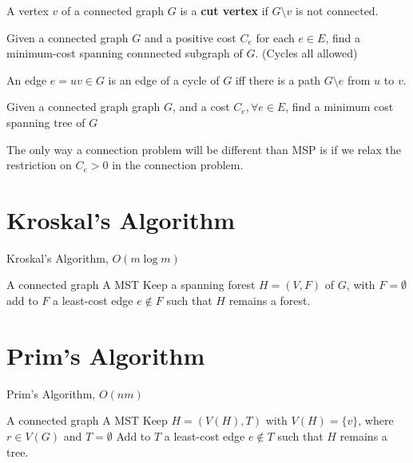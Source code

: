 			\begin{definition}
				A vertex $v$ of a connected graph $G$ is a \textbf{cut vertex} if $G\setminus v$ is not connected.
			\end{definition}

			\begin{definition}
				Given a connected graph $G$ and a positive cost $C_e$ for each $e\in E$, find a minimum-cost spanning connnected subgraph of $G$. (Cycles all allowed)
			\end{definition}

			\begin{lemma}
				An edge $e = uv \in G$ is an edge of a cycle of $G$ iff there is a path $G\setminus e$ from $u$ to $v$.
			\end{lemma}

			\begin{definition}
				Given a connected graph graph $G$, and a cost $C_e, \forall e\in E$, find a minimum cost spanning tree of $G$
			\end{definition}

			The only way a connection problem will be different than MSP is if we relax the restriction on $C_e > 0$ in the connection problem.

		\section{Kroskal's Algorithm}
			\begin{algorithm}
				\caption{Kroskal's Algorithm, $O(m \log m)$}
				\begin{algorithmic}
					\REQUIRE A connected graph
					\ENSURE A MST
					\STATE Keep a spanning forest $H=(V, F)$ of $G$, with $F=\emptyset$
						\STATE add to $F$ a least-cost edge $e\notin F$ such that $H$ remains a forest.
					\ENDWHILE
				\end{algorithmic}
			\end{algorithm}

		\section{Prim's Algorithm}
			\begin{algorithm}
				\caption{Prim's Algorithm, $O(nm)$}
				\begin{algorithmic}
					\REQUIRE A connected graph
					\ENSURE A MST
					\STATE Keep $H = (V(H), T)$ with $V(H) = \{v\}$, where $r\in V(G)$ and $T=\emptyset$
					\WHILE {$|V(T)| < |V|$}
						\STATE Add to $T$ a least-cost edge $e \notin T$ such that $H$ remains a tree.
					\ENDWHILE
				\end{algorithmic}
			\end{algorithm}


